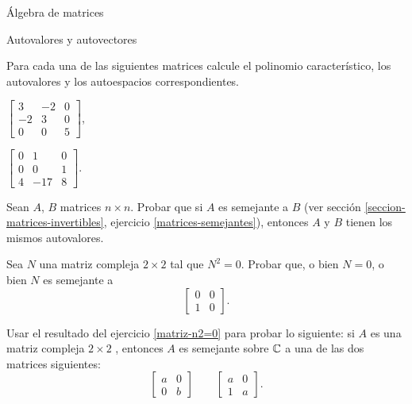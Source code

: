 \begin{chapter}{\'Algebra de matrices}
\begin{section}{Autovalores y autovectores}
\begin{enumex}
            \item Para cada una de las siguientes matrices calcule el polinomio característico, los autovalores y los autoespacios correspondientes.
                \begin{enumex}
                    \begin{minipage}{0.3\textwidth}
                    \item $\begin{bmatrix} 3&-2&0 \\-2 &3&0\\0&0&5\end{bmatrix}$,\end{minipage}
                    \begin{minipage}{0.3\textwidth}
                    \item $\begin{bmatrix} 0&1&0 \\ 0&0&1\\4&-17&8 \end{bmatrix}$.\end{minipage}
                \end{enumex}
            
            \item   Sean $A$, $B$ matrices $n \times n$. Probar que si $A$ es semejante a $B$ (ver sección \ref{seccion-matrices-invertibles}, ejercicio \ref{matrices-semejantes}),  entonces $A$ y $B$ tienen los mismos autovalores.  
            \item\label{matriz-n2=0} Sea $N$ una matriz compleja $2 \times 2$ tal que $N^2 =0$. Probar que, o bien $N=0$, o bien $N$  es semejante a 
            $$
            \begin{bmatrix}
                0&0\\1&0
            \end{bmatrix}.
            $$ 
            \item Usar el resultado del ejercicio \ref{matriz-n2=0} para probar lo siguiente: si $A$ es una matriz compleja $2 \times 2$ ,  entonces $A$ es semejante sobre $\mathbb C$ a una de las dos matrices siguientes:
            $$
            \begin{bmatrix}
                a&0\\0&b
            \end{bmatrix}\qquad
            \begin{bmatrix}
                a&0\\1&a
            \end{bmatrix}. 
            $$
        \end{enumex}
    
\end{section}    

\end{chapter}

